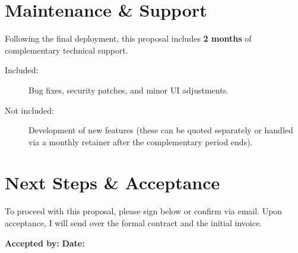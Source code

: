 \documentclass[11pt, a4paper]{article}
\begin{document}
\section{Maintenance \& Support}

Following the final deployment, this proposal includes \textbf{2 months} of
complementary technical support.

\begin{description}
  \item[Included:] Bug fixes, security patches, and minor UI adjustments.
  \item[Not included:] Development of new features (these can be quoted separately
    or handled via a monthly retainer after the complementary period ends).
\end{description}

\section{Next Steps \& Acceptance}

To proceed with this proposal, please sign below or confirm via email. Upon
acceptance, I will send over the formal contract and the initial invoice.

\vspace{1.5cm}

\noindent
\textbf{Accepted by:} \makebox[5cm]{\dotfill} \hspace{1cm}
\textbf{Date:} \makebox[3cm]{\dotfill}
\end{document}
